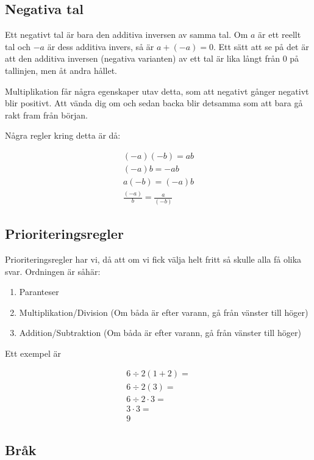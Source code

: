 \subsection{Negativa tal}

Ett negativt tal är bara den additiva inversen av samma tal. Om $a$ är ett reellt tal och $-a$ är dess additiva invers, så är $a+(-a)=0$. Ett sätt att se på det är att den additiva inversen (negativa varianten) av ett tal är lika långt från $0$ på tallinjen, men åt andra hållet. 

Multiplikation får några egenskaper utav detta, som att negativt gånger negativt blir positivt. Att vända dig om och sedan backa blir detsamma som att bara gå rakt fram från början.

Några regler kring detta är då:

\begin{align}
	(-a)(-b) = ab \\
	(-a)b = -ab \\
	a(-b) = (-a)b \\
	\frac{(-a)}{b} = \frac{a}{(-b)}
\end{align}

\newpage
\subsection{Prioriteringsregler}

Prioriteringsregler har vi, då att om vi fick välja helt fritt så skulle alla få olika svar. Ordningen är såhär:

\begin{enumerate}
	\item Paranteser
	\item Multiplikation/Division (Om båda är efter varann, gå från vänster till höger)
	\item Addition/Subtraktion (Om båda är efter varann, gå från vänster till höger)
\end{enumerate}

Ett exempel är 

\begin{align*}
	6\div 2(1+2) = \\
	6\div 2(3) = \\
	6\div 2 \cdot 3 = \\
	3 \cdot 3 = \\
	9
\end{align*}

\newpage
\subsection{Bråk}

